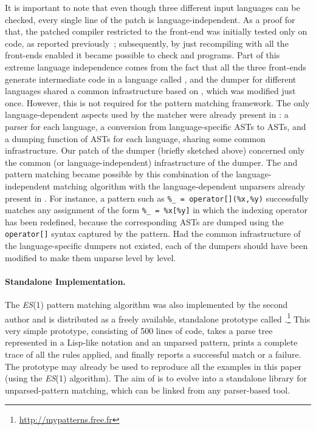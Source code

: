 It is important to note that even though three different input
languages can be checked, every single line of the patch is
language\hyp{}independent. As a proof for that, the patched \GCC
compiler restricted to the \Clang front\hyp{}end was initially tested
only on \Clang code, as reported previously~\cite{ppdp}; subsequently,
by just recompiling \GCC with all the front\hyp{}ends enabled it
became possible to check \cpp{} and \Ada programs. Part of this
extreme language independence comes from the fact that all the three
front\hyp{}ends generate intermediate code in a language called
\Gimple, and the dumper for different languages shared a common
infrastructure based on \Gimple, which was modified just
once. However, this is not required for the pattern matching
framework. The only language\hyp{}dependent aspects used by the
matcher were already present in \GCC: a parser for each language, a
conversion from language\hyp{}specific ASTs to \Gimple ASTs, and a
dumping function of \Gimple ASTs for each language, sharing some
common infrastructure. Our patch of the dumper (briefly sketched
above) concerned only the common (or language\hyp{}independent)
infrastructure of the dumper. The \cpp{} and \Ada pattern matching
became possible by this combination of the language\hyp{}independent
matching algorithm with the language\hyp{}dependent unparsers already
present in \GCC.  For instance, a pattern such as \texttt{\%\_ =
operator[](\%x,\%y)} successfully matches any \cpp{} assignment of the
form \texttt{\%\_ = \%x[\%y]} in which the indexing operator has been
redefined, because the corresponding \Gimple ASTs are dumped using the
\texttt{operator[]} syntax captured by the pattern.  Had the common
infrastructure of the language\hyp{}specific dumpers not existed, each
of the dumpers should have been modified to make them unparse level by
level.

\paragraph{Standalone Implementation.}

The \textit{ES}(1) pattern matching algorithm was also implemented by
the second author and is distributed as a freely available, standalone
prototype called \Matchbox.\footnote{\url{http://mypatterns.free.fr}}
This very simple prototype, consisting of 500 lines of \Clang code,
takes a parse tree represented in a \textsf{Lisp}\hyp{}like notation
and an unparsed pattern, prints a complete trace of all the rules
applied, and finally reports a successful match or a failure. The
prototype may already be used to reproduce all the examples in this
paper (using the \textit{ES}(1) algorithm). The aim of \Matchbox is to
evolve into a standalone library for unparsed\hyp{}pattern matching,
which can be linked from any parser\hyp{}based tool.

